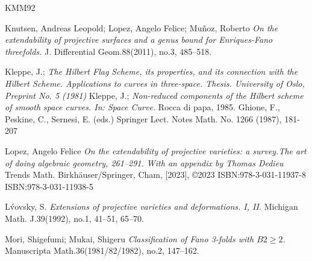 \documentclass[11pt,twoside]{amsart}
\theoremstyle{plain}
\numberwithin{equation}{section}
\theoremstyle{definition}
\begin{document}
\begin{thebibliography}{KMM92}

Knutsen, Andreas Leopold; Lopez, Angelo Felice; Muñoz, Roberto
\emph{On the extendability of projective surfaces and a genus bound for Enriques-Fano threefolds.}
J. Differential Geom.88(2011), no.3, 485–518.

Kleppe, J.; 
\emph{The Hilbert Flag Scheme, its properties, and its connection with the Hilbert Scheme. Applications to curves in three-space. Thesis. University of Oslo, Preprint No. 5 (1981)}
Kleppe, J.;
\emph{Non-reduced components of the Hilbert scheme of smooth space curves. In: Space Curve.}
Rocca di papa, 1985. Ghione, F., Peskine, C., Sernesi, E. (eds.) Springer Lect. Notes Math. No. 1266 (1987), 181-207



  












\color{black}



Lopez, Angelo Felice
\emph{On the extendability of projective varieties: a survey.The art of doing algebraic geometry, 261–291. With an appendix by Thomas Dedieu}
Trends Math. Birkhäuser/Springer, Cham, [2023], ©2023 ISBN:978-3-031-11937-8
ISBN:978-3-031-11938-5



L\'vovsky, S.
\emph{Extensions of projective varieties and deformations. I, II.}
Michigan Math. J.39(1992), no.1, 41–51, 65--70.





Mori, Shigefumi; Mukai, Shigeru
\emph{Classification of Fano 3-folds with $B2 \geq 2$.}
Manuscripta Math.36(1981/82/1982), no.2, 147–162.



\end{thebibliography}
\end{document}

